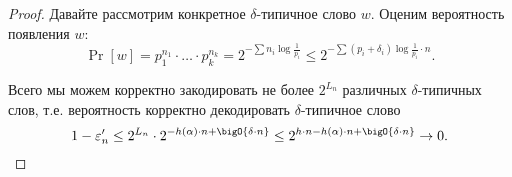 \begin{proof}
    Давайте рассмотрим конкретное $\delta$-типичное слово $w$. Оценим вероятность появления $w$:
    $$
        \Pr[w] = p_1^{n_1} \cdot \dots \cdot p_k^{n_k}
        = 2^{-\sum n_i \log\frac{1}{p_i}} \le 2^{-\sum (p_i + \delta_i) \log\frac{1}{p_i} \cdot n}.
    $$

    Всего мы можем корректно закодировать не более $2^{L_n}$ различных $\delta$-типичных слов,
    т.е. вероятность корректно декодировать $\delta$-типичное слово
    $$
        1 - \varepsilon'_n \le 2^{L_n} \cdot 2^{-h(\alpha) \cdot n + \bigO{\delta \cdot n}} \le
        2^{h \cdot n - h(\alpha) \cdot n + \bigO{\delta \cdot n}} \to 0.
    $$
\end{proof}
